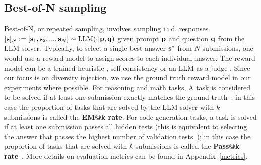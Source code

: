 \subsection{Best-of-N sampling}
\label{sec:background_bon}
Best-of-N, or repeated sampling, involves sampling i.i.d. responses $[\mathbf{s}]_N := [\mathbf{s}_1, \mathbf{s}_2,..., \mathbf{s}_N] \sim \text{LLM} (\cdot| \mathbf{p}, \mathbf{q})$ given prompt $\mathbf{p}$ and question $\mathbf{q}$ from the LLM solver. 
Typically, to select a single best answer $\mathbf{s}^*$ from $N$ submissions, one would use a reward model to assign scores to each individual answer. 
The reward model can be a trained heuristic \citep{zhang2024generativeverifiersrewardmodeling}, self-consistency \citep{wang2023selfconsistency} or an LLM-as-a-judge \citep{zheng2023judgingllmasajudgemtbenchchatbot}. 
Since our focus is on diversity injection, we use the ground truth reward model in our experiments where possible.
For reasoning and math tasks, A task is considered to be solved if at least one submission exactly matches the ground truth~\cite{wang2023math}; in this case the proportion of tasks that are solved by the LLM solver with $k$ submissions is called the \textbf{EM@k rate}. 
For code generation tasks, a task is solved if at least one submission passes all hidden tests (this is equivalent to selecting the answer that passes the highest number of validation tests~\cite{chen2024alphamath}); in this case the proportion of tasks that are solved with $k$ submissions is called the \textbf{Pass@k rate}~\cite{chen2021evaluating}. More details on evaluation metrics can be found in Appendix~\ref{metrics}. 
